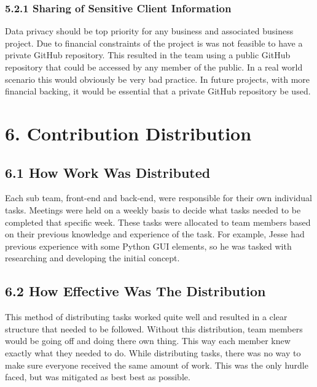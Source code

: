 \documentclass[11pt]{article}
\begin{document}
\begin{adjustwidth}{1cm}{}

\subsubsection{5.2.1 Sharing of Sensitive Client Information}
Data privacy should be top priority for any business and associated business project. Due to financial constraints of the project is was not feasible to have a private GitHub repository. This resulted in the team using a public GitHub repository that could be accessed by any member of the public. In a real world scenario this would obviously be very bad practice. In future projects, with more financial backing, it would be essential that a private GitHub repository be used. \\

\end{adjustwidth}



\section{6. Contribution Distribution}

\subsection{6.1 How Work Was Distributed}
Each sub team, front-end and back-end, were responsible for their own individual tasks. Meetings were held on a weekly basis to decide what tasks needed to be completed that specific week. These tasks were allocated to team members based on their previous knowledge and experience of the task. For example, Jesse had previous experience with some Python GUI elements, so he was tasked with researching and developing the initial concept.


\subsection{6.2 How Effective Was The Distribution}
This method of distributing tasks worked quite well and resulted in a clear structure that needed to be followed. Without this distribution, team members would be going off and doing there own thing. This way each member knew exactly what they needed to do. While distributing tasks, there was no way to make sure everyone received the same amount of work. This was the only hurdle faced, but was mitigated as best best as possible.
\end{document}
